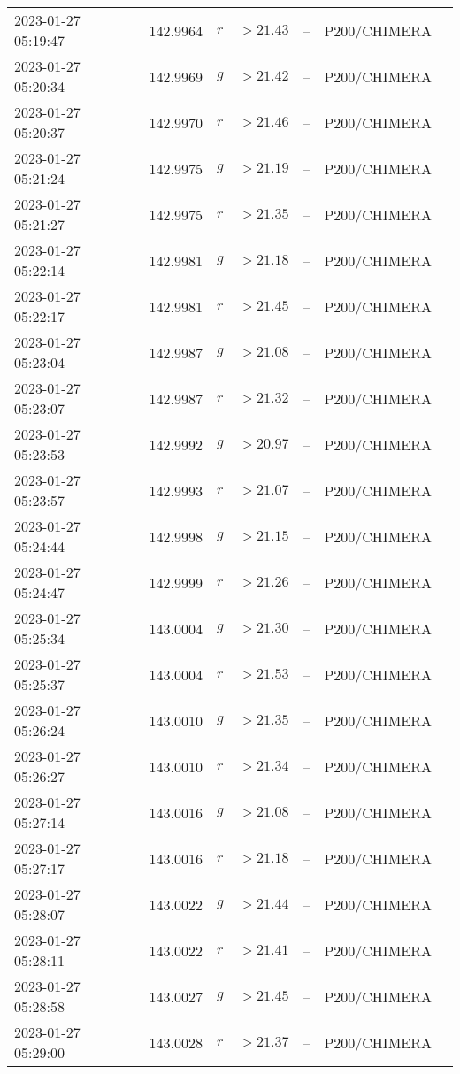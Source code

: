 \documentclass{nature_plusfigure}
\begin{document}
\begin{supplement}
\begin{center}
\begin{longtable}{lllllll}
2023-01-27 05:19:47 & 142.9964 & $r$ & $>21.43$ & -- & P200/CHIMERA &  \\ 
2023-01-27 05:20:34 & 142.9969 & $g$ & $>21.42$ & -- & P200/CHIMERA &  \\ 
2023-01-27 05:20:37 & 142.9970 & $r$ & $>21.46$ & -- & P200/CHIMERA &  \\ 
2023-01-27 05:21:24 & 142.9975 & $g$ & $>21.19$ & -- & P200/CHIMERA &  \\ 
2023-01-27 05:21:27 & 142.9975 & $r$ & $>21.35$ & -- & P200/CHIMERA &  \\ 
2023-01-27 05:22:14 & 142.9981 & $g$ & $>21.18$ & -- & P200/CHIMERA &  \\ 
2023-01-27 05:22:17 & 142.9981 & $r$ & $>21.45$ & -- & P200/CHIMERA &  \\ 
2023-01-27 05:23:04 & 142.9987 & $g$ & $>21.08$ & -- & P200/CHIMERA &  \\ 
2023-01-27 05:23:07 & 142.9987 & $r$ & $>21.32$ & -- & P200/CHIMERA &  \\ 
2023-01-27 05:23:53 & 142.9992 & $g$ & $>20.97$ & -- & P200/CHIMERA &  \\ 
2023-01-27 05:23:57 & 142.9993 & $r$ & $>21.07$ & -- & P200/CHIMERA &  \\ 
2023-01-27 05:24:44 & 142.9998 & $g$ & $>21.15$ & -- & P200/CHIMERA &  \\ 
2023-01-27 05:24:47 & 142.9999 & $r$ & $>21.26$ & -- & P200/CHIMERA &  \\ 
2023-01-27 05:25:34 & 143.0004 & $g$ & $>21.30$ & -- & P200/CHIMERA &  \\ 
2023-01-27 05:25:37 & 143.0004 & $r$ & $>21.53$ & -- & P200/CHIMERA &  \\ 
2023-01-27 05:26:24 & 143.0010 & $g$ & $>21.35$ & -- & P200/CHIMERA &  \\ 
2023-01-27 05:26:27 & 143.0010 & $r$ & $>21.34$ & -- & P200/CHIMERA &  \\ 
2023-01-27 05:27:14 & 143.0016 & $g$ & $>21.08$ & -- & P200/CHIMERA &  \\ 
2023-01-27 05:27:17 & 143.0016 & $r$ & $>21.18$ & -- & P200/CHIMERA &  \\ 
2023-01-27 05:28:07 & 143.0022 & $g$ & $>21.44$ & -- & P200/CHIMERA &  \\ 
2023-01-27 05:28:11 & 143.0022 & $r$ & $>21.41$ & -- & P200/CHIMERA &  \\ 
2023-01-27 05:28:58 & 143.0027 & $g$ & $>21.45$ & -- & P200/CHIMERA &  \\ 
2023-01-27 05:29:00 & 143.0028 & $r$ & $>21.37$ & -- & P200/CHIMERA &  \\ 

\end{longtable}
\end{center}
\end{supplement}
\end{document}
